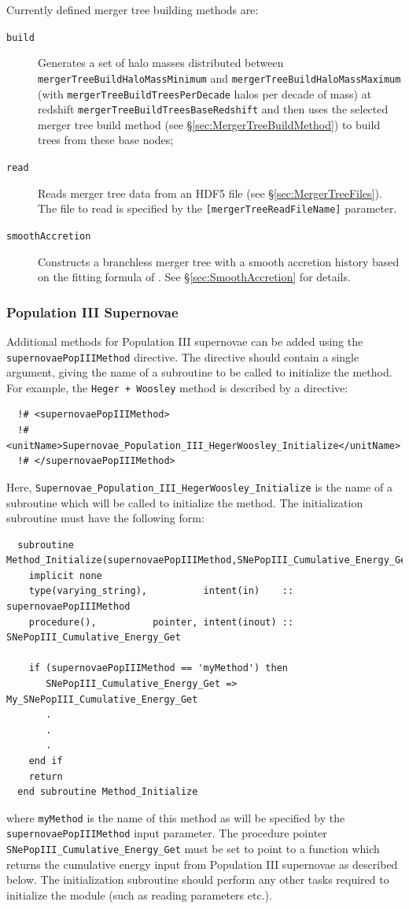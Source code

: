 Currently defined merger tree building methods are:
\begin{description}
 \item [{\tt build}] Generates a set of halo masses distributed between {\tt mergerTreeBuildHaloMassMinimum} and {\tt mergerTreeBuildHaloMassMaximum} (with {\tt mergerTreeBuildTreesPerDecade} halos per decade of mass) at redshift {\tt mergerTreeBuildTreesBaseRedshift} and then uses the selected merger tree build method (see \S\ref{sec:MergerTreeBuildMethod}) to build trees from these base nodes;
 \item [{\tt read}] Reads merger tree data from an HDF5 file (see \S\ref{sec:MergerTreeFiles}). The file to read is specified by the {\tt [mergerTreeReadFileName]} parameter.
 \item [{\tt smoothAccretion}] Constructs a branchless merger tree with a smooth accretion history based on the fitting formula of \cite{wechsler_concentrations_2002}. See \S\ref{sec:SmoothAccretion} for details.
\end{description}

\subsubsection{Population III Supernovae}

Additional methods for Population III supernovae can be added using the {\tt supernovaePopIIIMethod} directive. The directive should contain a single argument, giving the name of a subroutine to be called to initialize the method. For example, the {\tt Heger + Woosley} method is described by a directive:
\begin{verbatim}
  !# <supernovaePopIIIMethod>
  !#  <unitName>Supernovae_Population_III_HegerWoosley_Initialize</unitName>
  !# </supernovaePopIIIMethod>
\end{verbatim}
Here, {\tt Supernovae\_Population\_III\_HegerWoosley\_Initialize} is the name of a subroutine which will be called to initialize the method. The initialization subroutine must have the following form:
\begin{verbatim}
  subroutine Method_Initialize(supernovaePopIIIMethod,SNePopIII_Cumulative_Energy_Get)
    implicit none
    type(varying_string),          intent(in)    :: supernovaePopIIIMethod
    procedure(),          pointer, intent(inout) :: SNePopIII_Cumulative_Energy_Get
    
    if (supernovaePopIIIMethod == 'myMethod') then
       SNePopIII_Cumulative_Energy_Get => My_SNePopIII_Cumulative_Energy_Get
       .
       .
       .
    end if
    return
  end subroutine Method_Initialize
\end{verbatim}
where {\tt myMethod} is the name of this method as will be specified by the {\tt supernovaePopIIIMethod} input parameter. The procedure pointer {\tt SNePopIII\_Cumulative\_Energy\_Get} must be set to point to a function which returns the cumulative energy input from Population III supernovae as described below. The initialization subroutine should perform any other tasks required to initialize the module (such as reading parameters etc.).

